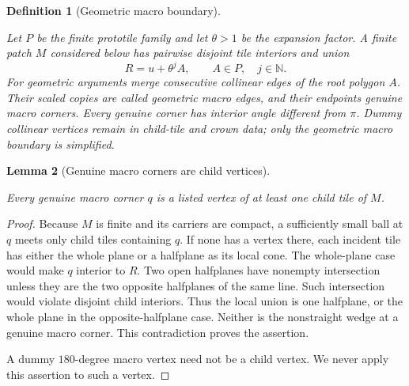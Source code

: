 \documentclass[11pt,a4paper]{article}
\newtheorem{definition}{Definition}[section]
\newtheorem{lemma}[definition]{Lemma}
\theoremstyle{remark}
\newcommand{\lean}[1]{}
\newcommand{\uses}[1]{}
\begin{document}
\begin{definition}[Geometric macro boundary]
\label{def:macro-boundary}
\lean{Tilings.Crowns.geometricMacroBoundary}
\uses{def:polygon,def:protoset,def:substitution}
Let $P$ be the finite prototile family and let $\theta>1$ be the expansion
factor.  A finite patch $M$ considered below has pairwise disjoint tile
interiors and union
\[
 R=u+\theta^j A,\qquad A\in P,\quad j\in\mathbb N.
\]
For geometric arguments merge consecutive collinear edges of the root
polygon $A$.  Their scaled copies are called \emph{geometric macro edges},
and their endpoints \emph{genuine macro corners}.  Every genuine corner
has interior angle different from $\pi$.  Dummy collinear vertices remain
in child-tile and crown data; only the geometric macro boundary is simplified.
\end{definition}

\begin{lemma}[Genuine macro corners are child vertices]
\label{lem:macrocorner}
\lean{Tilings.Crowns.macrocornerIsChildVertex}
\uses{def:tiling,def:macro-boundary,lem:polygon-local-cone}
Every genuine macro corner $q$ is a listed vertex of at least one child
tile of $M$.
\end{lemma}
\begin{proof}
Because $M$ is finite and its carriers are compact, a sufficiently small
ball at $q$ meets only child tiles containing $q$.  If none has a vertex
there, each incident tile has either the whole plane or a halfplane as
its local cone.  The whole-plane case would make $q$ interior to $R$.
Two open halfplanes have nonempty intersection unless they are the two
opposite halfplanes of the same line.  Such intersection would violate
disjoint child interiors.  Thus the local union is one halfplane, or the
whole plane in the opposite-halfplane case.  Neither is the nonstraight
wedge at a genuine macro corner.  This contradiction proves the assertion.

A dummy $180$-degree macro vertex need not be a child vertex.  We never
apply this assertion to such a vertex.
\end{proof}
\end{document}
